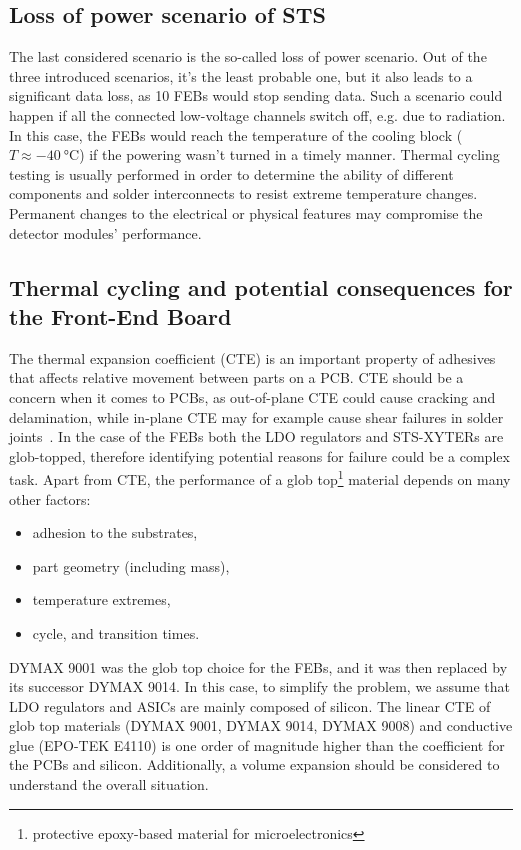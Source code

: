 \subsection{Loss of power scenario of STS}
\label{power_loss}
The last considered scenario is the so-called loss of power scenario. Out of the three introduced scenarios, it's the least probable one, but it also leads to a significant data loss, as 10 \glspl{FEB} would stop sending data. Such a scenario could happen if all the connected low-voltage channels switch off, e.g. due to radiation. In this case, the \glspl{FEB} would reach the temperature of the cooling block ($T \approx \SI{-40}{\celsius}$) if the powering wasn't turned in a timely manner.
Thermal cycling testing is usually performed in order to determine the ability of different components and solder interconnects to resist extreme temperature changes. Permanent changes to the electrical or physical features may compromise the detector modules' performance. 
\subsection{Thermal cycling and potential consequences for the Front-End Board}

The thermal expansion coefficient (\gls{CTE}) is an important property of adhesives that affects relative movement between parts on a \gls{PCB}. \gls{CTE} should be a concern when it comes to \glspl{PCB}, as out-of-plane \gls{CTE} could cause cracking and delamination, while in-plane \gls{CTE} may for example cause shear failures in solder joints~\cite{cte_report}. In the case of the \glspl{FEB} both the \gls{LDO} regulators and STS-XYTERs are glob-topped, therefore identifying potential reasons for failure could be a complex task. Apart from \gls{CTE}, the performance of a glob top\footnote{protective epoxy-based material for microelectronics} material depends on many other factors:
\begin{itemize}
    \item adhesion to the substrates,
    \item part geometry (including mass),
    \item temperature extremes,
    \item cycle, and transition times.
\end{itemize}
DYMAX 9001 was the glob top choice for the \glspl{FEB}, and it was then replaced by its successor DYMAX 9014. In this case, to simplify the problem, we assume that \gls{LDO} regulators and \glspl{ASIC} are mainly composed of silicon. The linear CTE of glob top materials (DYMAX 9001, DYMAX 9014, DYMAX 9008) and conductive glue (EPO-TEK E4110) is one order of magnitude higher than the coefficient for the \glspl{PCB} and silicon. Additionally, a volume expansion should be considered to understand the overall situation.

